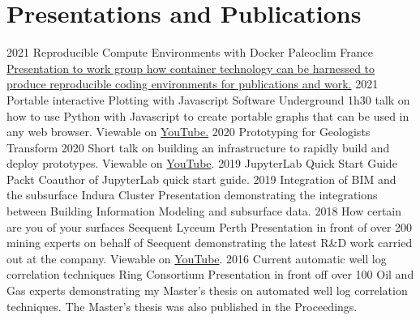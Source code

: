 \documentclass[]{friggeri-cv}
\begin{document}
\begin{entrylist}

\end{entrylist}
\newpage
\vspace*{\fill}
\section{Presentations and Publications}
\begin{entrylist}
	\entry
	{2021}
	{Reproducible Compute Environments with Docker}
	{Paleoclim France}
	{\href{https://wesleythegeolien.github.io/Presentations/docker_reproducible_envs/index.html}{Presentation to work group how container technology can be harnessed to produce reproducible coding environments for publications and work.}}
	\entry
	{2021}
	{Portable interactive Plotting with Javascript}
	{Software Underground}
	{1h30 talk on how to use Python with Javascript to create portable graphs that can be used in any web browser. Viewable on \href{https://www.youtube.com/watch?v=j\_4wkMzGvKs}{YouTube.}}
	\entry
	{2020}
	{Prototyping for Geologists}
	{Transform 2020}
	{Short talk on building an infrastructure to rapidly build and deploy prototypes.
	Viewable on \href{https://youtu.be/rUbvueIF5f8?t=4130}{YouTube}.}
	\entry
	{2019}
	{JupyterLab Quick Start Guide}
	{Packt}
	{Coauthor of JupyterLab quick start guide.}
	\entry
	{2019}
	{Integration of BIM and the subsurface}
	{Indura Cluster}
	{Presentation demonstrating the integrations between Building Information Modeling and subsurface data.}
	\entry
	{2018}
	{How certain are you of your surfaces}
	{Seequent Lyceum Perth}
	{Presentation in front of over 200 mining experts on behalf of Seequent demonstrating the latest R\&D work carried out at the company. Viewable on \href{https://www.youtube.com/watch?v=jt26J5ljlA0}{YouTube}.}
	\entry
	{2016}
	{Current automatic well log correlation techniques}
	{Ring Consortium}
	{Presentation in front off over 100 Oil and Gas experts demonstrating my Master's thesis on automated well log correlation techniques. The Master's thesis was also published in the Proceedings.}
\end{entrylist}
\end{document}

